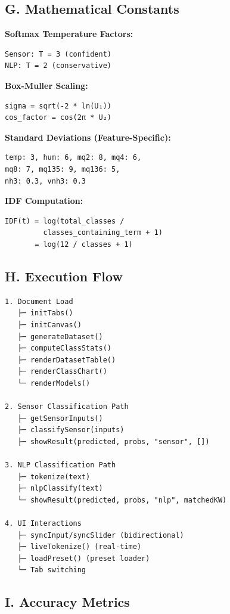 \documentclass[10pt]{article}
\begin{document}
{\subsection*{G. Mathematical Constants}

\textbf{Softmax Temperature Factors:}
\begin{verbatim}
Sensor: T = 3 (confident)
NLP: T = 2 (conservative)
\end{verbatim}

\textbf{Box-Muller Scaling:}
\begin{verbatim}
sigma = sqrt(-2 * ln(U₁))
cos_factor = cos(2π * U₂)
\end{verbatim}

\textbf{Standard Deviations (Feature-Specific):}
\begin{verbatim}
temp: 3, hum: 6, mq2: 8, mq4: 6,
mq8: 7, mq135: 9, mq136: 5,
nh3: 0.3, vnh3: 0.3
\end{verbatim}

\textbf{IDF Computation:}
\begin{verbatim}
IDF(t) = log(total_classes / 
         classes_containing_term + 1)
       = log(12 / classes + 1)
\end{verbatim}

\subsection*{H. Execution Flow}

\begin{verbatim}
1. Document Load
   ├─ initTabs()
   ├─ initCanvas()
   ├─ generateDataset()
   ├─ computeClassStats()
   ├─ renderDatasetTable()
   ├─ renderClassChart()
   └─ renderModels()

2. Sensor Classification Path
   ├─ getSensorInputs()
   ├─ classifySensor(inputs)
   ├─ showResult(predicted, probs, "sensor", [])

3. NLP Classification Path
   ├─ tokenize(text)
   ├─ nlpClassify(text)
   └─ showResult(predicted, probs, "nlp", matchedKW)

4. UI Interactions
   ├─ syncInput/syncSlider (bidirectional)
   ├─ liveTokenize() (real-time)
   ├─ loadPreset() (preset loader)
   └─ Tab switching
\end{verbatim}

\subsection*{I. Accuracy Metrics}

}
\end{document}
